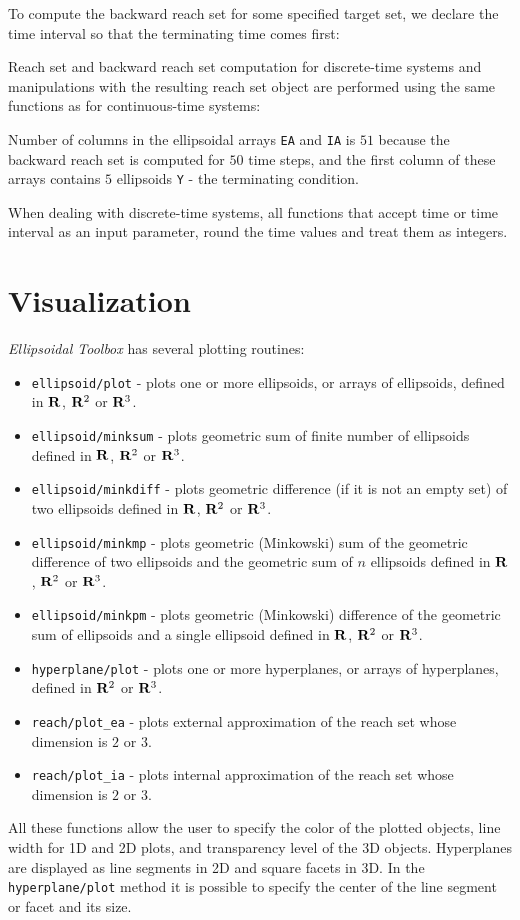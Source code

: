 \documentclass{report}
\begin{document}
To compute the backward reach set for some specified target set,
we declare the time interval so that the terminating time comes first:

Reach set and backward reach set computation for discrete-time systems and
manipulations with the resulting reach set object are performed using
the same functions as for continuous-time systems:

Number of columns in the ellipsoidal arrays {\tt EA} and {\tt IA} is $51$
because the backward reach set is computed for $50$ time steps, and the first
column of these arrays contains $5$ ellipsoids {\tt Y} - the terminating
condition.

When dealing with discrete-time systems, all functions that accept time or
time interval as an input parameter, round the time values and treat them as
integers.

\newpage
\section{Visualization}
{\it Ellipsoidal Toolbox} has several plotting routines:
\begin{itemize}
\item {\tt ellipsoid/plot} - plots one or more ellipsoids, or arrays of
ellipsoids, defined in ${\bf R}$, ${\bf R}^2$ or ${\bf R}^3$.
\item {\tt ellipsoid/minksum} - plots geometric sum of finite number of
ellipsoids defined in ${\bf R}$, ${\bf R}^2$ or ${\bf R}^3$.
\item {\tt ellipsoid/minkdiff} - plots geometric difference
(if it is not an empty set) of two ellipsoids defined in
${\bf R}$, ${\bf R}^2$ or ${\bf R}^3$.
\item {\tt ellipsoid/minkmp} - plots geometric (Minkowski) sum
of the geometric difference of two ellipsoids and the geometric sum of $n$
ellipsoids defined in ${\bf R}$, ${\bf R}^2$ or ${\bf R}^3$.
\item {\tt ellipsoid/minkpm} - plots geometric (Minkowski) difference of the
geometric sum of ellipsoids and a single ellipsoid defined in
${\bf R}$, ${\bf R}^2$ or ${\bf R}^3$.
\item {\tt hyperplane/plot} - plots one or more hyperplanes, or arrays of
hyperplanes, defined in ${\bf R}^2$ or ${\bf R}^3$.
\item {\tt reach/plot\_ea} - plots external approximation of the reach set
whose dimension is $2$ or $3$.
\item {\tt reach/plot\_ia} - plots internal approximation of the reach set
whose dimension is $2$ or $3$.
\end{itemize}
All these functions allow the user to specify the color of the plotted objects,
line width for 1D and 2D plots, and transparency level of the 3D objects.
Hyperplanes are displayed as line segments in 2D and square facets in 3D.
In the {\tt hyperplane/plot} method it is possible to specify the center
of the line segment or facet and its size.
\end{document}
